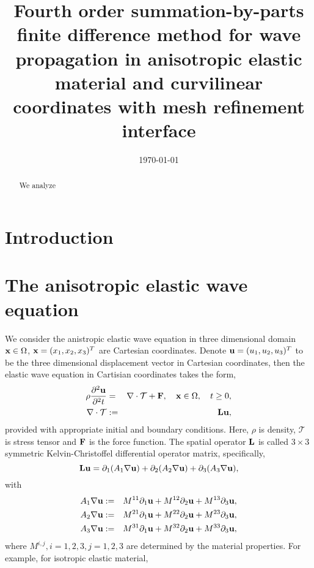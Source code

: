 \documentclass[a4paper]{article}
\title{Fourth order summation-by-parts finite difference method for wave propagation in anisotropic elastic material and curvilinear coordinates with mesh refinement interface}
\date{\today}
\begin{document}
\maketitle

\begin{abstract}
We analyze
\end{abstract}

\section{Introduction}

\section{The anisotropic elastic wave equation}
We consider the anistropic elastic wave equation in three dimensional domain ${\bf x} \in \Omega$, ${\bf x} = (x_1,x_2,x_3)^T$ are Cartesian coordinates. Denote ${\bf u} = (u_1,u_2,u_3)^T$ to be the three dimensional displacement vector in Cartesian coordinates, then the elastic wave equation in Cartisian coordinates takes the form,
\begin{eqnarray*}
    \rho\frac{\partial^2{\bf u}}{\partial^2 t} &=& \nabla\cdot\mathcal{T} + {\bf F}, \ \ \ {\bf x}\in\Omega,\ \ \ t\geq 0,\\
    \nabla\cdot\mathcal{T} &:=& {\bf Lu},
\end{eqnarray*}
provided with appropriate initial and boundary conditions. Here, $\rho$ is density, $\mathcal{T}$ is stress tensor and ${\bf F}$ is the force function. The spatial operator ${\bf L}$ is called $3\times3$ symmetric Kelvin-Christoffel differential operator matrix, specifically,
\begin{equation*}
    {\bf L u} = \partial_1(A_1\nabla{\bf u}) + \partial_2(A_2\nabla{\bf u}) + \partial_3(A_3\nabla{\bf u}),
\end{equation*}
with
\begin{eqnarray*}
A_1\nabla{\bf u} &:=& M^{11}\partial_1{\bf u} + M^{12}\partial_2{\bf u} + M^{13}\partial_3{\bf u}, \\
A_2\nabla{\bf u} &:=& M^{21}\partial_1{\bf u} + M^{22}\partial_2{\bf u} + M^{23}\partial_3{\bf u}, \\
A_3\nabla{\bf u} &:=& M^{31}\partial_1{\bf u} + M^{32}\partial_2{\bf u} + M^{33}\partial_3{\bf u},
\end{eqnarray*}
where $M^{i,j}, i = 1,2,3, j = 1,2,3$ are determined by the material properties. For example, for isotropic elastic material,
\end{document}
